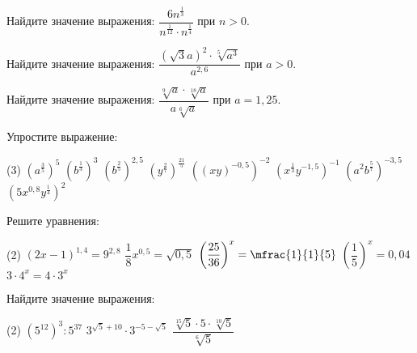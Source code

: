 \begin{class}[number=4]
\begin{listofex}
\begin{tasks}
		\end{tasks}
		\item Найдите значение выражения: \( \dfrac{6n^{\tfrac{1}{3}}}{n^{\tfrac{1}{12}} \cdot n^ {\tfrac{1}{4}}} \) при \( n>0 \).
		\item Найдите значение выражения: \( \dfrac{(\sqrt{3}a)^2 \cdot \sqrt[5]{a^3}}{a^{2,6}} \) при \( a>0 \).
		\item Найдите значение выражения: \( \dfrac{\sqrt[9]{a} \cdot \sqrt[18]{a}}{a\sqrt[6]{a}} \) при \( a=1,25 \).
	\end{listofex}
\end{class}

\begin{homework}[number=2]
	\begin{listofex}
		\item Упростите выражение:
		\begin{tasks}(3)
			\task \( \left(a^{ \tfrac{3}{5}} \right)^5 \)
			\task \( \left(b^{\tfrac{1}{3}} \right)^3 \)
			\task \( \left(b^{\tfrac{2}{5}}\right)^{2,5} \)
			\task \( \left(y^{ \tfrac{2}{7}}\right)^{\tfrac{21}{5}} \)
			\task \( ((xy)^{-0,5})^{-2} \)
			\task \( \left(x^{ \tfrac{1}{3}}y^{-1,5}\right)^{-1} \)
			\task \( \left(a^{2}b^{\tfrac{5}{7}}\right)^{-3,5} \)
			\task \( \left(5x^{0,8}y^{\tfrac{1}{4}}\right)^{2} \)
		\end{tasks}
		\item Решите уравнения:
		\begin{tasks}(2)
			\task \( (2x-1)^{1,4}=9^{2,8} \)
			\task \( \dfrac{1}{8}x^{0,5} = \sqrt{0,5} \)
			\task \( \left( \dfrac{25}{36} \right)^x=\mfrac{1}{1}{5} \)
			\task \( \left( \dfrac{1}{5} \right)^x=0,04 \)
			\task \( 3 \cdot 4^x = 4 \cdot 3^x \)
		\end{tasks}
		\item Найдите значение выражения:
		\begin{tasks}(2)
			\task \( (5^{12})^3 : 5^{37} \)
			\task \( 3^{\sqrt{5}+10}\cdot3^{-5-\sqrt{5}} \)
			\task \( \dfrac{\sqrt[15]{5}\cdot5\cdot\sqrt[10]{5}}{\sqrt[6]{5}} \)
		\end{tasks}
	\end{listofex}
\end{homework}

